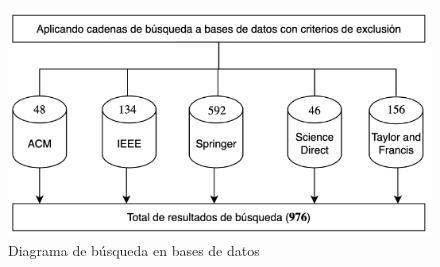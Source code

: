 \begin{figure}[H]
    \centering
    \includegraphics[scale=0.9] {tablas-images/cp2/bases-con-criterio.png}
    \caption{Diagrama de búsqueda en bases de datos}\label{fig:tabla-resumen-busqueda-con-criterio}
\end{figure}